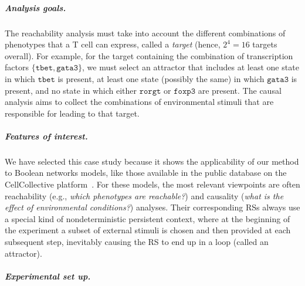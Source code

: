\subparagraph*{Analysis goals.}
The reachability analysis must take into account the different combinations of phenotypes that a T cell can express, called a \emph{target} (hence, $2^4=16$ targets overall).
For example, for the target containing the combination of transcription factors $\{\texttt{tbet},\texttt{gata3}\}$, we must select an attractor that includes at least one state in which $\texttt{tbet}$ is present, at least one state (possibly the same) in which $\texttt{gata3}$ is present, and no state in which either $\texttt{rorgt}$ or $\texttt{foxp3}$ are present. 
The causal analysis aims to collect the combinations of environmental stimuli that are responsible for leading to that target.

\subparagraph*{Features of interest.}
We have selected this case study because it shows the applicability of our method to Boolean networks models, like those available in the public database on the CellCollective platform~\cite{helikar2012cell}. 
For these models, the most relevant viewpoints are often reachability (e.g., \emph{which phenotypes are reachable?}) and causality (\emph{what is the effect of environmental conditions?}) analyses.
Their corresponding RSs always use a special kind of nondeterministic persistent context, where at the beginning of the experiment a subset of external stimuli is chosen and then provided at each subsequent step, inevitably causing the RS to end up in a loop (called an attractor).

\subparagraph*{Experimental set up.}

